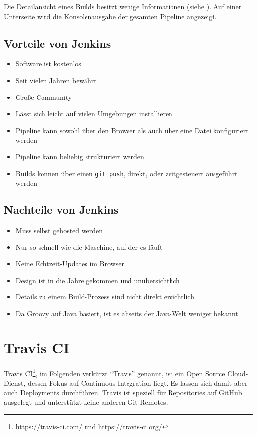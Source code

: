 Die Detailansicht eines Builds besitzt wenige Informationen (siehe ). Auf einer Unterseite wird die Konsolenausgabe der gesamten Pipeline angezeigt.

\subsection*{Vorteile von Jenkins}

\begin{itemize}
  \item Software ist kostenlos
  \item Seit vielen Jahren bewährt
  \item Große Community
  \item Lässt sich leicht auf vielen Umgebungen installieren
  \item Pipeline kann sowohl über den Browser als auch über eine Datei konfiguriert werden
  \item Pipeline kann beliebig strukturiert werden
  \item Builds können über einen \texttt{git push}, direkt, oder zeitgesteuert ausgeführt werden
\end{itemize}

\subsection*{Nachteile von Jenkins}

\begin{itemize}
  \item Muss selbst gehosted werden
  \item Nur so schnell wie die Maschine, auf der es läuft
  \item Keine Echtzeit-Updates im Browser
  \item Design ist in die Jahre gekommen und unübersichtlich
  \item Details zu einem Build-Prozess sind nicht direkt ersichtlich
  \item Da Groovy auf Java basiert, ist es abseits der Java-Welt weniger bekannt
\end{itemize}

\section{Travis CI}
\label{sec:analyse-travis}

Travis CI\footnote{https://travis-ci.com/ und https://travis-ci.org/}, im Folgenden verkürzt ``Travis'' genannt, ist ein Open Source Cloud-Dienst, dessen Fokus auf Continuous Integration liegt. Es lassen sich damit aber auch Deployments durchführen. Travis ist speziell für Repositories auf GitHub ausgelegt und unterstützt keine anderen Git-Remotes.

